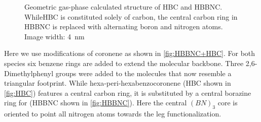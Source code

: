 \begin{figure}[h!]\centering
	 \quad
	\caption{Geometric gas-phase calculated structure of  HBC and  HBBNC. WhileHBC is constituted solely of carbon, the central carbon ring in HBBNC is replaced with alternating boron and nitrogen atoms. Image width: \SI{4}{\nano \meter}}
	\label{fig:HBBNC+HBC}
\end{figure}


Here we use modifications of coronene as shown in \autoref{fig:HBBNC+HBC}. For both species six benzene rings are added to extend the molecular backbone. Three 2,6-Dimethylphenyl groups were added to the molecules that now resemble a triangular footprint. While hexa‐peri‐hexabenzocoronene (HBC shown in \autoref{fig:HBC}) features a central carbon ring, it is substituted by a central borazine ring for (HBBNC shown in \autoref{fig:HBBNC}). Here the central $(BN)_3$ core is oriented to point all nitrogen atoms towards the leg functionalization.

